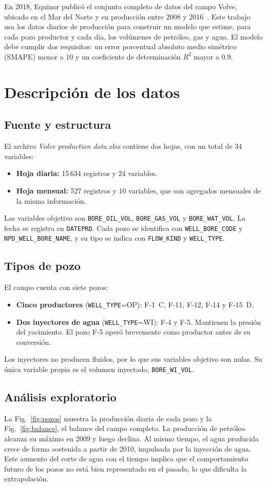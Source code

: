 \documentclass[journal]{IEEEtran}
\begin{document}
En 2018, Equinor publicó el conjunto completo de datos del campo Volve, ubicado en el Mar del Norte y en producción entre 2008 y 2016~\cite{equinor}. Este trabajo usa los datos diarios de producción para construir un modelo que estime, para cada pozo productor y cada día, los volúmenes de petróleo, gas y agua. El modelo debe cumplir dos requisitos: un error porcentual absoluto medio simétrico (SMAPE) menor a 10 y un coeficiente de determinación $R^2$ mayor a 0.9.

\section{Descripción de los datos}
\subsection{Fuente y estructura}
El archivo \textit{Volve production data.xlsx} contiene dos hojas, con un total de 34 variables:
\begin{itemize}
\item \textbf{Hoja diaria:} 15\,634 registros y 24 variables.
\item \textbf{Hoja mensual:} 527 registros y 10 variables, que son agregados mensuales de la misma información.
\end{itemize}
Las variables objetivo son \texttt{BORE\_OIL\_VOL}, \texttt{BORE\_GAS\_VOL} y \texttt{BORE\_WAT\_VOL}. La fecha se registra en \texttt{DATEPRD}. Cada pozo se identifica con \texttt{WELL\_BORE\_CODE} y \texttt{NPD\_WELL\_BORE\_NAME}, y su tipo se indica con \texttt{FLOW\_KIND} y \texttt{WELL\_TYPE}.

\subsection{Tipos de pozo}
El campo cuenta con siete pozos:
\begin{itemize}
\item \textbf{Cinco productores} (\texttt{WELL\_TYPE}=OP): F-1~C, F-11, F-12, F-14 y F-15~D.
\item \textbf{Dos inyectores de agua} (\texttt{WELL\_TYPE}=WI): F-4 y F-5. Mantienen la presión del yacimiento. El pozo F-5 operó brevemente como productor antes de su conversión.
\end{itemize}
Los inyectores no producen fluidos, por lo que sus variables objetivo son nulas. Su única variable propia es el volumen inyectado, \texttt{BORE\_WI\_VOL}.

\subsection{Análisis exploratorio}
La Fig.~\ref{fig:pozos} muestra la producción diaria de cada pozo y la Fig.~\ref{fig:balance}, el balance del campo completo. La producción de petróleo alcanza su máximo en 2009 y luego declina. Al mismo tiempo, el agua producida crece de forma sostenida a partir de 2010, impulsada por la inyección de agua. Este aumento del corte de agua con el tiempo implica que el comportamiento futuro de los pozos no está bien representado en el pasado, lo que dificulta la extrapolación.
\end{document}
